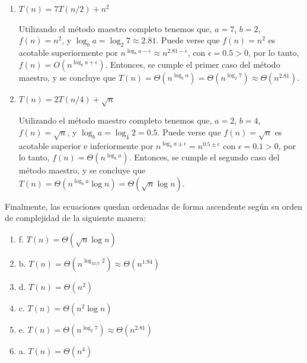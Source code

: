 \documentclass{article}
\begin{document}
\begin{enumerate}[label=\alph*.]
    \item $T(n) = 7T(n/2) + n^2$
    
    Utilizando el método maestro completo tenemos que, $a=7$, $b=2$, $f(n)=n^2$, y $\log_b a = \log_2 7 \approx 2.81$. Puede verse que $f(n)=n^2$ es acotable superiormente por $n^{\log_b a - \epsilon} \approx n^{2.81 - \epsilon}$, con $\epsilon = 0.5 > 0$, por lo tanto, $f(n) = O(n^{\log_b a + \epsilon})$. Entonces, se cumple el primer caso del método maestro, y se concluye que $T(n) = \Theta (n^{\log_b a}) = \Theta (n^{\log_2 7}) \approx \Theta (n^{2.81})$.


    \item $T(n) = 2T(n/4) + \sqrt{n}$
    
    Utilizando el método maestro completo tenemos que, $a=2$, $b=4$, $f(n)=\sqrt{n}$, y $\log_b a = \log_4 2 = 0.5$. Puede verse que $f(n)=\sqrt{n}$ es acotable superior e inferiormente por $n^{\log_b a \pm \epsilon} = n^{0.5 \pm \epsilon}$ con $\epsilon = 0.1 > 0$, por lo tanto, $f(n) = \Theta (n^{\log_b a})$. Entonces, se cumple el segundo caso del método maestro, y se concluye que $T(n) = \Theta(n^{\log_b a} \log n) = \Theta (\sqrt{n} \log n)$.

\end{enumerate}

Finalmente, las ecuaciones quedan ordenadas de forma ascendente según su orden de complejidad de la siguiente manera:

\begin{enumerate}
    \item f. $T(n) = \Theta (\sqrt{n} \log n)$
    \item b. $T(n) = \Theta (n^{\log_{10/7} 2}) \approx \Theta (n^{1.94})$
    \item d. $T(n) = \Theta (n^2)$
    \item c. $T(n) = \Theta (n^2 \log n)$
    \item e. $T(n) = \Theta (n^{\log_2 7}) \approx \Theta (n^{2.81})$
    \item a. $T(n) = \Theta (n^4)$
\end{enumerate}
\end{document}
